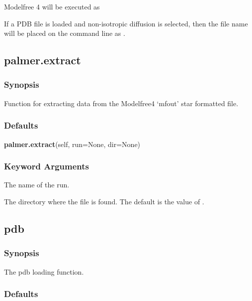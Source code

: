 Modelfree 4 will be executed as


If a PDB  file is loaded and non-isotropic diffusion is selected, then the file name will be
placed on the command line as 
.


\newpage

\subsection{palmer.extract}


\subsubsection{Synopsis}

Function for extracting data from the Modelfree4 `mfout' star formatted file.

\subsubsection{Defaults}

\textsf{\textbf{palmer.extract}(self, run=None, dir=None)}


\subsubsection{Keyword Arguments}


  The name of the run.

  The directory where the file 
 is found.  The default is the value of 
.


\newpage

\subsection{pdb}


\subsubsection{Synopsis}

The pdb loading function.

\subsubsection{Defaults}

